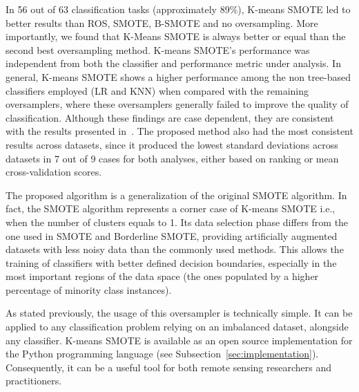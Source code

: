 \documentclass[information,article,submit,moreauthors,pdftex]{Definitions/mdpi}
\begin{document}
\begin{paracol}{2}
In 56 out of 63 classification tasks (approximately 89\%), K-means SMOTE led
to better results than ROS, SMOTE, B-SMOTE and no oversampling. More
importantly, we found that K-Means SMOTE is always better or equal than the
second best oversampling method.  K-means SMOTE's performance was independent
from both the classifier and performance metric under analysis. In general,
K-means SMOTE shows a higher performance among the non tree-based classifiers
employed (LR and KNN) when compared with the remaining oversamplers, where
these oversamplers generally failed to improve the quality of classification.
Although these findings are case dependent, they are consistent with the
results presented in~\citep{Douzas2018}. The proposed method also had the most
consistent results across datasets, since it produced the lowest standard
deviations across datasets in 7 out of 9 cases for both analyses, either based
on ranking or mean cross-validation scores.

The proposed algorithm is a generalization of the original SMOTE algorithm. In
fact, the SMOTE algorithm represents a corner case of K-means SMOTE i.e., when
the number of clusters equals to 1. Its data selection phase differs from the
one used in SMOTE and Borderline SMOTE, providing artificially augmented
datasets with less noisy data than the commonly used methods. This allows the
training of classifiers with better defined decision boundaries, especially in
the most important regions of the data space (the ones populated by a higher
percentage of minority class instances).

As stated previously, the usage of this oversampler is technically simple. It
can be applied to any classification problem relying on an imbalanced dataset,
alongside any classifier. K-means SMOTE is available as an open source
implementation for the Python programming language (see
Subsection~\ref{sec:implementation}).  Consequently, it can be a useful tool
for both remote sensing researchers and practitioners.





\end{paracol}

\end{document}
